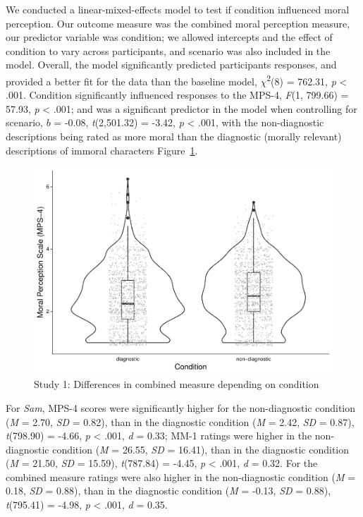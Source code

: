 \documentclass[
  american,
  man,floatsintext]{apa7}
\begin{document}
We conducted a linear-mixed-effects model to test if condition influenced moral perception. Our outcome measure was the combined moral perception measure, our predictor variable was condition; we allowed intercepts and the effect of condition to vary across participants, and scenario was also included in the model.
Overall, the model significantly predicted participants responses, and provided a better fit for the data than the baseline model, \(\chi\)\textsuperscript{2}(8) = 762.31, \emph{p} \textless{} .001. Condition significantly influenced responses to the MPS-4, \emph{F}(1, 799.66) = 57.93, \emph{p} \textless{} .001; and was a significant predictor in the model when controlling for scenario, \(b\) = -0.08, \emph{t}(2,501.32) = -3.42, \emph{p} \textless{} .001, with the non-diagnostic descriptions being rated as more moral than the diagnostic (morally relevant) descriptions of immoral characters Figure~\ref{fig:S1combinedconditionplot}.

\begin{figure}[!p]
\includegraphics{Supplementary_files/figure-latex/S1combinedconditionplot-1} \caption{Study 1: Differences in combined measure depending on condition}\label{fig:S1combinedconditionplot}
\end{figure}

For \emph{Sam}, MPS-4 scores were significantly higher for the non-diagnostic condition (\emph{M} = 2.70, \emph{SD} = 0.82), than in the diagnostic condition (\emph{M} = 2.42, \emph{SD} = 0.87), \emph{t}(798.90) = -4.66, \emph{p} \textless{} .001, \emph{d} = 0.33; MM-1 ratings were higher in the non-diagnostic condition (\emph{M} = 26.55, \emph{SD} = 16.41), than in the diagnostic condition (\emph{M} = 21.50, \emph{SD} = 15.59), \emph{t}(787.84) = -4.45, \emph{p} \textless{} .001, \emph{d} = 0.32. For the combined measure ratings were also higher in the non-diagnostic condition (\emph{M} = 0.18, \emph{SD} = 0.88), than in the diagnostic condition (\emph{M} = -0.13, \emph{SD} = 0.88), \emph{t}(795.41) = -4.98, \emph{p} \textless{} .001, \emph{d} = 0.35.
\end{document}
